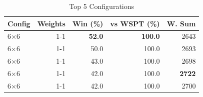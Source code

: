 \begin{table}[htbp]%
\centering%
\begin{tabular}{lrrrr}%
\toprule%
\textbf{Config}&\textbf{Weights}&\textbf{Win (\%)}&\textbf{vs WSPT (\%)}&\textbf{W. Sum}\\%
\midrule%
6×6&1-1&\textbf{52.0}&\textbf{100.0}&2643\\%
6×6&1-1&50.0&100.0&2693\\%
6×6&1-1&43.0&100.0&2698\\%
6×6&1-1&42.0&100.0&\textbf{2722}\\%
6×6&1-1&42.0&100.0&2700\\%
\bottomrule%
\end{tabular}%
\caption{Top 5 Configurations}%
\label{tab:summary}%
\end{table}